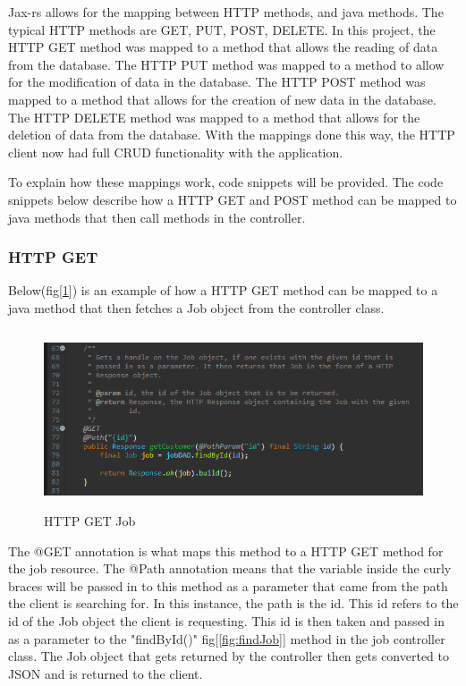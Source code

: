 \bigskip

Jax-rs allows for the mapping between HTTP methods, and java methods. The typical HTTP methods are GET, PUT, POST, DELETE. In this project, the HTTP GET method was mapped to a method that allows the reading of data from the database. The HTTP PUT method was mapped to a method to allow for the modification of data in the database. The HTTP POST method was mapped to a method that allows for the creation of new data in the database. The HTTP DELETE method was mapped to a method that allows for the deletion of data from the database. With the mappings done this way, the HTTP client now had full CRUD functionality with the application.

To explain how these mappings work, code snippets will be provided. The code snippets below describe how a HTTP GET and POST method can be mapped to java methods that then call methods in the controller.


\subsubsection{HTTP GET}
\label{sec:SystemDesignGET}

Below(fig[\ref{fig:httpGET}]) is an example of how a HTTP GET method can be mapped to a java method that then fetches a Job object from the controller class.

\begin{figure}[H]
    \centering
    \includegraphics[width=\textwidth, height=150pt]{DesignImages/JobGET.PNG}
    \caption{HTTP GET Job}
    \label{fig:httpGET}
\end{figure}

\bigskip

The @GET annotation is what maps this method to a HTTP GET method for the job resource. The @Path annotation means that the variable inside the curly braces will be passed in to this method as a parameter that came from the path the client is searching for. In this instance, the path is the id. This id refers to the id of the Job object the client is requesting. This id is then taken and passed in as a parameter to the "findById()" fig[\ref{fig:findJob}] method in the job controller class. The Job object that gets returned by the controller then gets converted to JSON and is returned to the client.

